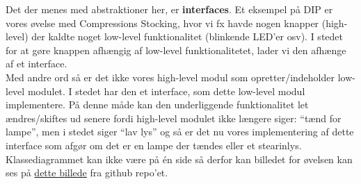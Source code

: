 Det der menes med abstraktioner her, er \textbf{interfaces}. Et eksempel på DIP er vores øvelse med Compressions Stocking, hvor vi fx havde nogen knapper (high-level) der kaldte noget low-level funktionalitet (blinkende LED’er osv). I stedet for at gøre knappen afhængig af low-level funktionalitetet, lader vi den afhænge af et interface.\\

Med andre ord så er det ikke vores high-level modul som opretter/indeholder low-level modulet. I stedet har den et interface, som dette low-level modul implementere.
På denne måde kan den underliggende funktionalitet let ændres/skiftes ud senere fordi high-level modulet ikke længere siger: “tænd for lampe”, men i stedet siger “lav lys” og så er det nu vores implementering af dette interface som afgør om det er en lampe der tændes eller et stearinlys.\\ 

Klassediagrammet kan ikke være på én side så derfor kan billedet for øvelsen kan ses på  \href{https://raw.githubusercontent.com/BjornNorgaard/I4SWD/bdd4a11a87f182d81b3ed81409a2052e45be82c3/Eksamen/Disposition/figs/compressionstockings_classdiagram.PNG}{dette billede} fra github repo'et.